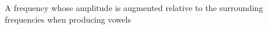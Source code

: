 A frequency whose amplitude is augmented relative to the surrounding frequencies when producing vowels
